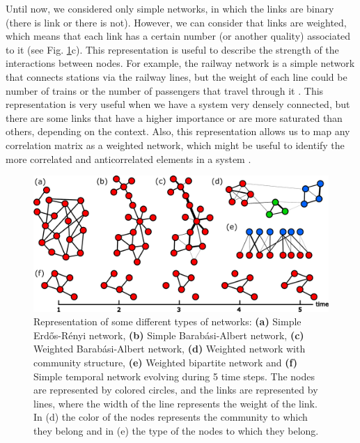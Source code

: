 Until now, we considered only simple networks, in which the links are binary (there is link or there is not). However, we can consider that links are weighted, which means that each link has a certain number (or another quality) associated to it \cite{barrat2004architecture} (see Fig. \ref{fig:netwotk_types}c). This representation is useful to describe the strength of the interactions between nodes. For example, the railway network is a simple network that connects stations via the railway lines, but the weight of each line could be number of trains or the number of passengers that travel through it \cite{latora-2002}. This representation is very useful when we have a system very densely connected, but there are some links that have a higher importance or are more saturated than others, depending on the context. Also, this representation allows us to map any correlation matrix as a weighted network, which might be useful to identify the more correlated and anticorrelated elements in a system \cite{onnela-2003,tumminello-2005}.

\begin{figure}
    \centering
    \includegraphics[width=\textwidth]{Figs/Introduction/network_plot.pdf}
    \caption[Different network types]{Representation of some different types of networks: \textbf{(a)} Simple Erd\H{o}s-R\'enyi network, \textbf{(b)} Simple Barab\'asi-Albert network, \textbf{(c)} Weighted Barab\'asi-Albert network, \textbf{(d)} Weighted network with community structure, \textbf{(e)} Weighted bipartite network and \textbf{(f)} Simple temporal network evolving during 5 time steps. The nodes are represented by colored circles, and the links are represented by lines, where the width of the line represents the weight of the link. In (d) the color of the nodes represents the community to which they belong and in (e) the type of the nodes to which they belong.}
    \label{fig:netwotk_types}
\end{figure}


